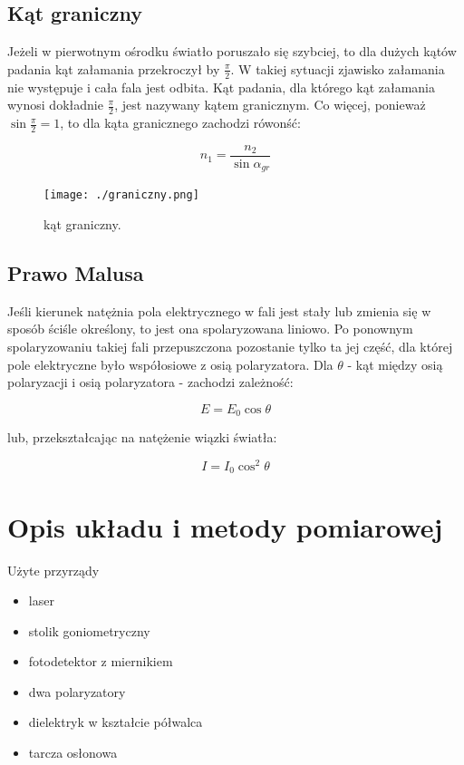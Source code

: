 \documentclass[a4paper,10pt]{article}
\begin{document}
\subsection{Kąt graniczny}
Jeżeli w pierwotnym ośrodku światło poruszało się szybciej, to dla dużych kątów padania kąt załamania przekroczył by $\frac{\pi}{2}$. W takiej sytuacji zjawisko załamania nie występuje i cała fala jest odbita. Kąt padania, dla którego kąt załamania wynosi dokładnie $\frac{\pi}{2}$, jest nazywany kątem granicznym. Co więcej, ponieważ $\sin{\frac{\pi}{2}} = 1$, to dla kąta granicznego zachodzi rówonść:

\begin{equation}
 n_1 = \frac{n_2}{\sin{\alpha_{gr}}}
\end{equation}

\begin{figure}[H]
\centering
\texttt{[image: ./graniczny.png]}
  \caption{kąt graniczny.}
  \label{}
\end{figure}

\subsection{Prawo Malusa}
Jeśli kierunek natężnia pola elektrycznego w fali jest stały lub zmienia się w sposób ściśle określony, to jest ona spolaryzowana liniowo. Po ponownym spolaryzowaniu takiej fali przepuszczona pozostanie tylko ta jej część, dla której pole elektryczne było współosiowe z osią polaryzatora. Dla $\theta$ - kąt między osią polaryzacji i osią polaryzatora - zachodzi zależność:

\begin{equation}
  E = E_0 \cos{\theta}
\end{equation}

lub, przekształcając na natężenie wiązki światła:

\begin{equation}
  I=I_0 \cos^2{\theta}
\end{equation}


\section{Opis układu i metody pomiarowej}
Użyte przyrządy
\begin{itemize}
  \item laser
  \item stolik goniometryczny
  \item fotodetektor z miernikiem
  \item dwa polaryzatory
  \item dielektryk w kształcie półwalca
  \item tarcza osłonowa
\end{itemize}
\end{document}

